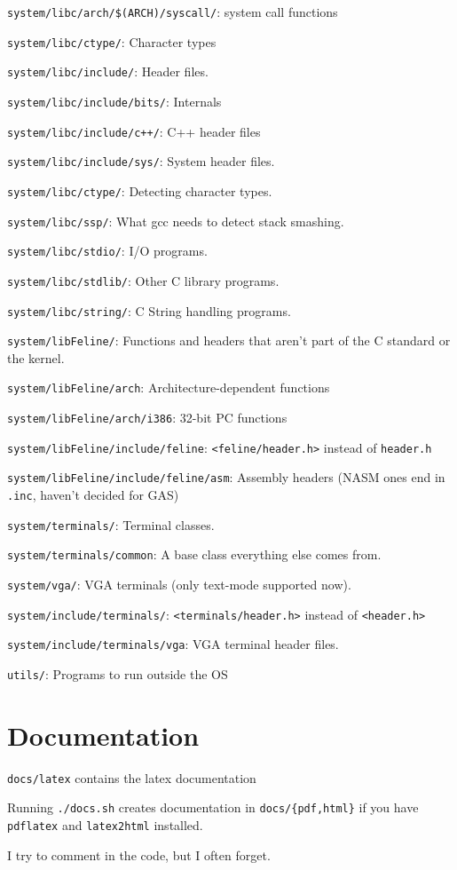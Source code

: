 \documentclass[12pt]{article}
\newcommand{\code}[1]{\colorbox{light-gray}{\texttt{#1}}}
\begin{document}
\begin{list}{}{}
\item \code{system/libc/arch/\$(ARCH)/syscall/}: system call functions
\item \code{system/libc/ctype/}: Character types
\item \code{system/libc/include/}: Header files.
\item \code{system/libc/include/bits/}: Internals
\item \code{system/libc/include/c++/}: C++ header files
\item \code{system/libc/include/sys/}: System header files.
\item \code{system/libc/ctype/}: Detecting character types.
\item \code{system/libc/ssp/}: What gcc needs to detect stack smashing.
\item \code{system/libc/stdio/}: I/O programs.
\item \code{system/libc/stdlib/}: Other C library programs.
\item \code{system/libc/string/}: C String handling programs.
\item \code{system/libFeline/}: Functions and headers that aren't part of the C standard or the kernel.
\item \code{system/libFeline/arch}: Architecture-dependent functions
\item \code{system/libFeline/arch/i386}: 32-bit PC functions
\item \code{system/libFeline/include/feline}: \code{<feline/header.h>} instead of \code{header.h}
\item \code{system/libFeline/include/feline/asm}: Assembly headers (NASM ones end in \code{.inc}, haven't decided for GAS)
\item \code{system/terminals/}: Terminal classes.
\item \code{system/terminals/common}: A base class everything else comes from.
\item \code{system/vga/}: VGA terminals (only text-mode supported now).
\item \code{system/include/terminals/}: \code{<terminals/header.h>} instead of \code{<header.h>}
\item \code{system/include/terminals/vga}: VGA terminal header files.
\item \code{utils/}: Programs to run outside the OS
\end{list}

\section{Documentation}
\begin{list}{}{}
\item \code{docs/latex} contains the latex documentation
\item Running \code{./docs.sh} creates documentation in \code{docs/\{pdf,html\}} if you have \code{pdflatex} and \code{latex2html} installed.
\item I try to comment in the code, but I often forget.
\end{list}
\end{document}
